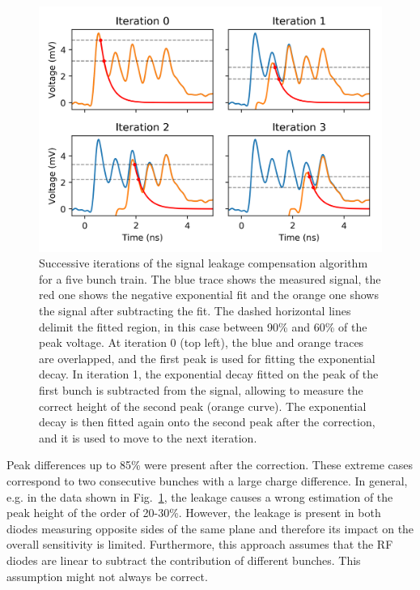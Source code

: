 \begin{figure}[!t]
\centering
\includegraphics[scale=1, keepaspectratio]{pictures/train_compensation}
\caption{Successive iterations of the signal leakage compensation algorithm for a five bunch train. The blue trace shows the measured signal, the red one shows the negative exponential fit and the orange one shows the signal after subtracting the fit. The dashed horizontal lines delimit the fitted region, in this case between 90\% and 60\% of the peak voltage. At iteration 0 (top left), the blue and orange traces are overlapped, and the first peak is used for fitting the exponential decay. In iteration 1, the exponential decay fitted on the peak of the first bunch is subtracted from the signal, allowing to measure the correct height of the second peak (orange curve). The exponential decay is then fitted again onto the second peak after the correction, and it is used to move to the next iteration.}\label{fig:train_comp}
\end{figure}




Peak differences up to 85\% were present after the correction. These extreme cases correspond to two consecutive bunches with a large charge difference. In general, e.g. in the data shown in Fig.~\ref{fig:train_comp}, the leakage causes a wrong estimation of the peak height of the order of 20-30\%. However, the leakage is present in both diodes measuring opposite sides of the same plane and therefore its impact on the overall sensitivity is limited. Furthermore, this approach assumes that the RF diodes are linear to subtract the contribution of different bunches. This assumption might not always be correct. 
 

